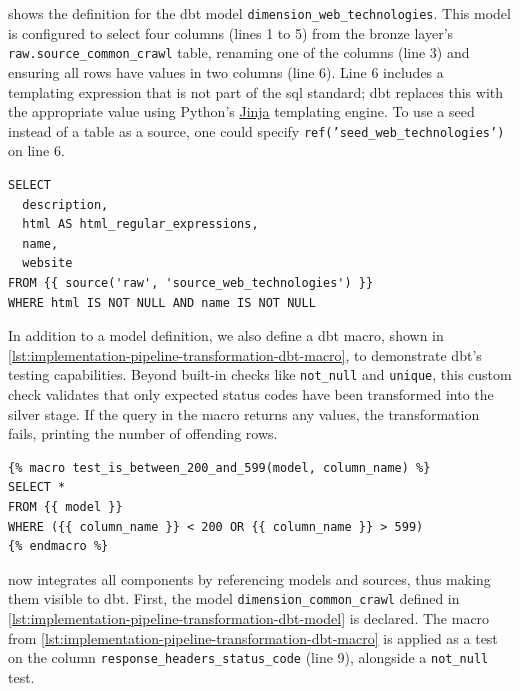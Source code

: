  shows the definition for the dbt model \texttt{dimension\_web\_technologies}.
This model is configured to select four columns (lines 1 to 5) from the bronze layer's \texttt{raw.source\_common\_crawl} table, renaming one of the columns (line 3) and ensuring all rows have values in two columns (line 6).
Line 6 includes a templating expression that is not part of the \ac{sql} standard; dbt replaces this with the appropriate value using Python's \href{https://jinja.palletsprojects.com/}{Jinja} templating engine.
To use a seed instead of a table as a source, one could specify \texttt{ref('seed\_web\_technologies')} on line 6.

\begin{listing}[H]
\begin{verbatim}
SELECT
  description,
  html AS html_regular_expressions,
  name,
  website
FROM {{ source('raw', 'source_web_technologies') }}
WHERE html IS NOT NULL AND name IS NOT NULL
\end{verbatim}
\caption{The dbt model \texttt{dimension\_web\_technologies}.}
\label{lst:implementation-pipeline-transformation-dbt-model}
\end{listing}

In addition to a model definition, we also define a dbt macro, shown in \cref{lst:implementation-pipeline-transformation-dbt-macro}, to demonstrate dbt's testing capabilities.
Beyond built-in checks like \texttt{not\_null} and \texttt{unique}, this custom check validates that only expected status codes have been transformed into the silver stage.
If the query in the macro returns any values, the transformation fails, printing the number of offending rows.

\begin{listing}[H]
\begin{verbatim}
{% macro test_is_between_200_and_599(model, column_name) %}
SELECT *
FROM {{ model }}
WHERE ({{ column_name }} < 200 OR {{ column_name }} > 599)
{% endmacro %}
\end{verbatim}
\caption{A dbt macro that checks for a reasonable \ac{http} status code.}
\label{lst:implementation-pipeline-transformation-dbt-macro}
\end{listing}

 now integrates all components by referencing models and sources, thus making them visible to dbt.
First, the model \texttt{dimension\_common\_crawl} defined in \cref{lst:implementation-pipeline-transformation-dbt-model} is declared.
The macro from \cref{lst:implementation-pipeline-transformation-dbt-macro} is applied as a test on the column \texttt{response\_headers\_status\_code} (line 9), alongside a \texttt{not\_null} test.


